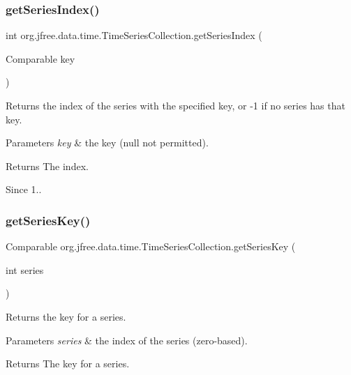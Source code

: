 \subsubsection{\texorpdfstring{get\+Series\+Index()}{getSeriesIndex()}}
{\footnotesize\ttfamily int org.\+jfree.\+data.\+time.\+Time\+Series\+Collection.\+get\+Series\+Index (\begin{DoxyParamCaption}\item[{Comparable}]{key }\end{DoxyParamCaption})}

Returns the index of the series with the specified key, or -\/1 if no series has that key.


\begin{DoxyParams}{Parameters}
{\em key} & the key ({\ttfamily null} not permitted).\\
\hline
\end{DoxyParams}
\begin{DoxyReturn}{Returns}
The index.
\end{DoxyReturn}
\begin{DoxySince}{Since}
1.. 
\end{DoxySince}
\mbox{\label{classorg_1_1jfree_1_1data_1_1time_1_1_time_series_collection_a79496508884a25a1b69753670e8751a9}} 
\subsubsection{\texorpdfstring{get\+Series\+Key()}{getSeriesKey()}}
{\footnotesize\ttfamily Comparable org.\+jfree.\+data.\+time.\+Time\+Series\+Collection.\+get\+Series\+Key (\begin{DoxyParamCaption}\item[{int}]{series }\end{DoxyParamCaption})}

Returns the key for a series.


\begin{DoxyParams}{Parameters}
{\em series} & the index of the series (zero-\/based).\\
\hline
\end{DoxyParams}
\begin{DoxyReturn}{Returns}
The key for a series. 
\end{DoxyReturn}


